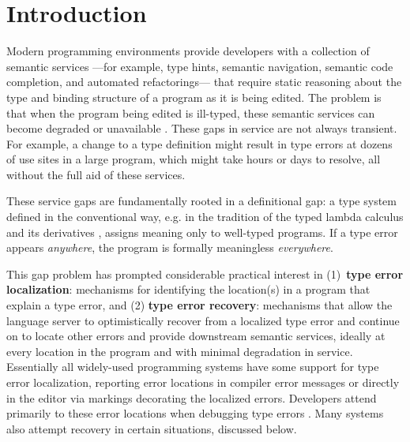 \section{Introduction}
\label{sec:introduction}


Modern programming environments provide developers with a collection of semantic services%
---for example, type hints, semantic navigation, semantic code completion, and automated refactorings---%
that require static reasoning about the type and binding structure of a program as it is being edited. 
The problem is that when the program being edited is ill-typed, 
these semantic services can become degraded or unavailable \cite{HazelnutSNAPL}. 
These gaps in service are not always transient. 
For example, a change to a type definition might result in type errors at dozens of use sites in a large program, which might take hours or days to resolve, all without the full aid of these services.

These service gaps are fundamentally rooted in a definitional gap: a type system defined in the conventional way, 
e.g. in the tradition of the typed lambda calculus and its derivatives \cite{TaplBook,pfpl},
assigns meaning only to well-typed programs. 
If a type error appears \emph{anywhere}, the program is formally meaningless \emph{everywhere}.

This gap problem has prompted considerable practical interest in 
(1)~\textbf{type error localization}: mechanisms for identifying the location(s) in a program that explain a type error, and 
(2) \textbf{type error recovery}: mechanisms that allow the language server to optimistically recover from a localized type error 
and continue on to locate other errors and provide downstream semantic services, 
ideally at every location in the program and with minimal degradation in service.
Essentially all widely-used programming systems have some support for type error localization, 
reporting error locations in compiler error messages 
or directly in the editor via markings decorating the localized errors. Developers attend primarily to these error locations when debugging type errors \cite{DBLP:journals/jfp/JoostenBH93}.
Many systems also attempt recovery in certain situations, discussed below.

